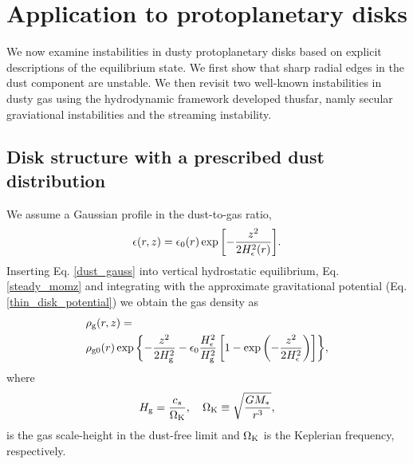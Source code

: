 



\section{Application to protoplanetary disks}\label{linear_problem}
We now examine instabilities in dusty protoplanetary disks
based on explicit descriptions of the equilibrium state. We first show
that sharp radial edges in the dust component are unstable. We then
revisit two well-known instabilities in dusty gas using the
hydrodynamic framework developed thusfar, namly secular graviational
instabilities and the streaming instability. 

\subsection{Disk structure with a prescribed dust distribution}\label{steady_state}  
We assume a Gaussian profile in the
dust-to-gas ratio,    
\begin{align}\label{dust_gauss}
  \epsilon(r,z) = \epsilon_0(r)
  \exp{\left[-\frac{z^2}{2H_\epsilon^2(r)}\right]}. 
\end{align}
Inserting Eq. \ref{dust_gauss} into vertical hydrostatic equilibrium,
Eq. \ref{steady_momz} and integrating with the approximate
gravitational potential (Eq. \ref{thin_disk_potential}) we obtain the
gas density as
\begin{align}
  &\rho_\mathrm{g}(r,z)= \notag\\
&\rho_\mathrm{g0}(r)\exp{\left\{ - \frac{z^2}{2H_\mathrm{g}^2}
    -\epsilon_0\frac{H_\epsilon^2}{H_\mathrm{g}^2}\left[1 -
      \exp{\left(-\frac{z^2}{2H_\epsilon^2}\right)}\right] \right\}}, 
\end{align}
where
\begin{align}
  H_\mathrm{g} = \frac{c_s}{\Omega_{\rm K}}, \quad \Omega_{\rm K} \equiv \sqrt{\frac{GM_*}{r^3}},   
\end{align}
is the gas scale-height in the dust-free limit and $\Omega_{\rm K}$ is the
Keplerian frequency, respectively. 

